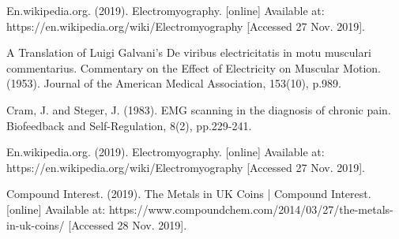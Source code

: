 \documentclass[12pt]{article}
\begin{document}
     
    \newpage   
    \begin{thebibliography}{}
        En.wikipedia.org. (2019). Electromyography. [online] Available at: https://en.wikipedia.org/wiki/Electromyography [Accessed 27 Nov. 2019].

        A Translation of Luigi Galvani's De viribus electricitatis in motu musculari commentarius. Commentary on the Effect of Electricity on Muscular Motion. (1953). Journal of the American Medical Association, 153(10), p.989.
        
        Cram, J. and Steger, J. (1983). EMG scanning in the diagnosis of chronic pain. Biofeedback and Self-Regulation, 8(2), pp.229-241.
        
        En.wikipedia.org. (2019). Electromyography. [online] Available at: https://en.wikipedia.org/wiki/Electromyography [Accessed 27 Nov. 2019].
        
        Compound Interest. (2019). The Metals in UK Coins | Compound Interest. [online] Available at: https://www.compoundchem.com/2014/03/27/the-metals-in-uk-coins/ [Accessed 28 Nov. 2019].
    \end{thebibliography}
            
    
\end{document}
